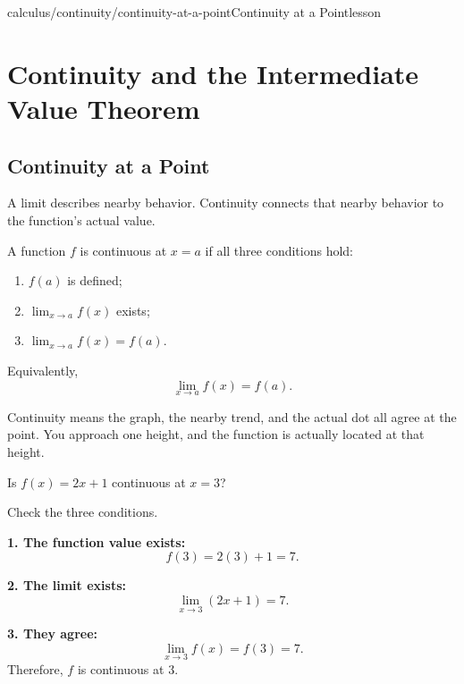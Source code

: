 \begin{webpage}{calculus/continuity/continuity-at-a-point}{Continuity at a Point}{lesson}
\chapter{Continuity and the Intermediate Value Theorem}

\section{Continuity at a Point}


A limit describes nearby behavior. Continuity connects that nearby behavior to the function's actual value.

\begin{bgdefinition}[title={Continuity at \(x=a\)}]
A function \(f\) is continuous at \(x=a\) if all three conditions hold:
\begin{enumerate}
  \item \(f(a)\) is defined;
  \item \(\displaystyle\lim_{x\to a}f(x)\) exists;
  \item \(\displaystyle\lim_{x\to a}f(x)=f(a)\).
\end{enumerate}
Equivalently,
\[
  \boxed{\lim_{x\to a}f(x)=f(a)}.
\]
\end{bgdefinition}

\begin{bgconcept}
Continuity means the graph, the nearby trend, and the actual dot all agree at the point. You approach one height, and the function is actually located at that height.
\end{bgconcept}

\begin{bgguided}[title={A continuous line}]
Is \(f(x)=2x+1\) continuous at \(x=3\)?

\begin{bgsolution}
Check the three conditions.

\textbf{1. The function value exists:}
\[
  f(3)=2(3)+1=7.
\]

\textbf{2. The limit exists:}
\[
  \lim_{x\to3}(2x+1)=7.
\]

\textbf{3. They agree:}
\[
  \lim_{x\to3}f(x)=f(3)=7.
\]
Therefore, \(f\) is continuous at \(3\).
\end{bgsolution}
\end{bgguided}


\end{webpage}
